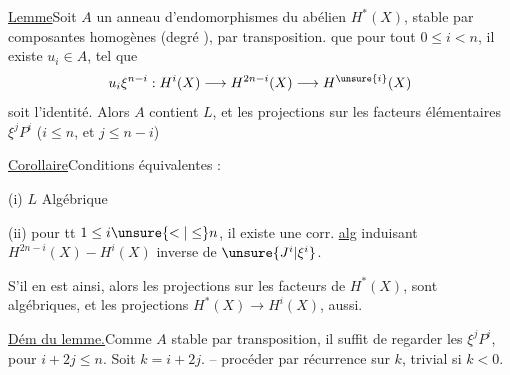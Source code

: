 
\uline{Lemme}\quad Soit $A$ un anneau d'endomorphismes du  abélien $H^*(X)$, stable par composantes homogènes (degré ), par transposition.   que pour tout $0\leq i<n$, il existe $u_i\in A$,  tel que
\[
u_i\xi^{n-i}:H^i(X)\longrightarrow H^{2n-i}(X)\longrightarrow H^{\unsure{i}}(X)
\]
soit l'identité.
Alors $A$ contient $L$\unsure{!},  et les projections sur les facteurs élémentaires $\xi^jP^i$ ($i\leq n$, et  $j\leq n-i$)

\uline{Corollaire}\quad Conditions équivalentes :

(i) $L$ Algébrique

(ii) pour tt $1\leq i\unsure{<|\leq}n$, il existe une corr. \uline{alg} induisant $H^{2n-i}(X)\mathbin{-}H^i(X)$ inverse de $\unsure{J^i|\xi^i}$.

 S'il en est ainsi, alors les \deleted{$\unsure{\xi}$} projections sur les facteurs  de $H^*(X)$, sont algébriques, et les projections $H^*(X)\to H^i(X)$, aussi.

\uline{Dém du lemme.}\quad Comme $A$ stable par transposition, il suffit de regarder les $\xi^jP^i$, pour $i+2j\leq n$. Soit $k=i+2j$. -- procéder par récurrence sur $k$, trivial si $k<0$.

